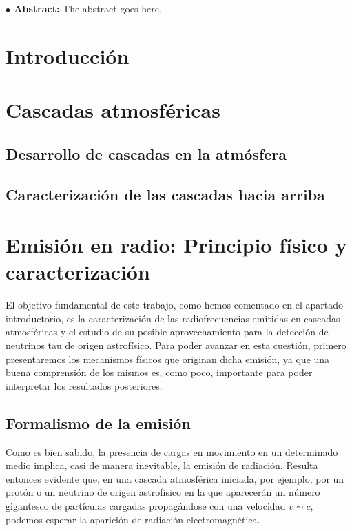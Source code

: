 \documentclass[12 pt, a4paper]{article} %
\numberwithin{equation}{section}
\numberwithin{figure}{section}
\begin{document}
	
	\begin{flushleft}  {\bf $\bullet$ Abstract:\;\;}
		The abstract goes here.
	\end{flushleft}\mbox{}
	
	\clearpage
	\pagestyle{fancy}
	\lhead{}
	\chead{}
	\rhead{}
	\renewcommand{\headrulewidth}{0.1pt}
	\lfoot{} 
	\cfoot{\thepage}
	\rfoot{} 
	\renewcommand{\footrulewidth}{0pt}
	
	\setcounter{page}{1}
	\tableofcontents
	\clearpage
	
	\section{Introducción}
	\clearpage
	\section{Cascadas atmosféricas}
	\subsection{Desarrollo de cascadas en la atmósfera}
	\subsection{Caracterización de las cascadas hacia arriba}
	\clearpage %
	\section{Emisión en radio: Principio físico y caracterización}
	El objetivo fundamental de este trabajo, como hemos comentado en el apartado introductorio, es la caracterización de las radiofrecuencias emitidas en cascadas atmosféricas y el estudio de su posible aprovechamiento para la detección de neutrinos tau de origen astrofísico. Para poder avanzar en esta cuestión, primero presentaremos los mecanismos físicos que originan dicha emisión, ya que una buena comprensión de los mismos es, como poco, importante para poder interpretar los resultados posteriores.
	\subsection{Formalismo de la emisión}
	Como es bien sabido, la presencia de cargas en movimiento en un determinado medio implica, casi de manera inevitable, la emisión de radiación. Resulta entonces evidente que, en una cascada atmosférica iniciada, por ejemplo, por un protón o un neutrino de origen astrofísico en la que aparecerán un número gigantesco de partículas cargadas propagándose con una velocidad $v\sim c$, podemos esperar la aparición de radiación electromagnética.
	
\end{document}

